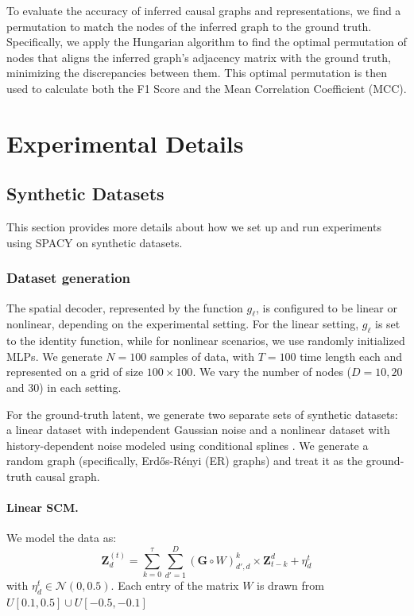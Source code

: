 To evaluate the accuracy of inferred causal graphs and representations, we find a permutation to match the nodes of the inferred graph to the ground truth. Specifically, we apply the Hungarian algorithm to find the optimal permutation of nodes that aligns the inferred graph’s adjacency matrix with the ground truth, minimizing the discrepancies between them. This optimal permutation is then used to calculate both the F1 Score and the Mean Correlation Coefficient (MCC). 

\section{Experimental Details}

\subsection{Synthetic Datasets}
This section provides more details about how we set up and run experiments using SPACY on synthetic datasets.

\subsubsection{Dataset generation} 
\label{app:dataset_generation}

The spatial decoder, represented by the function $g_\ell$, is configured to be linear or nonlinear, depending on the experimental setting. For the linear setting, $g_\ell$ is set to the identity function, while for nonlinear scenarios, we use randomly initialized MLPs. We generate $N=100$ samples of data, with $T = 100$ time length each and represented on a grid of size \(100 \times 100\). We vary the number of nodes ($D=10, 20$ and $30$) in each setting.

For the ground-truth latent, we generate two separate sets of synthetic datasets: a linear dataset with independent Gaussian noise and a nonlinear dataset with history-dependent noise modeled using conditional splines \cite{durkan2019neural}. We generate a random graph (specifically, Erdős-Rényi (ER) graphs) and treat it as the ground-truth causal graph. 

\paragraph{Linear SCM.} We model the data as:
\begin{equation}
    \mathbf{Z}_d^{(t)} =  \sum_{k = 0}^{\tau} \sum_{d'=1}^{D} (\mathbf{G} \circ W)^{k}_{d',d} \times \mathbf{Z}^{d}_{t-k} + \eta^t_d
\end{equation}
 with \(\eta^t_d \in \mathcal{N}(0,0.5).\) Each entry of the matrix ${W}$ is drawn from ${U}[0.1,0.5] \cup {U}[-0.5,-0.1]$

